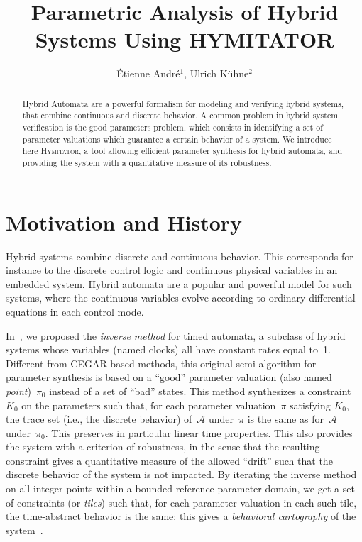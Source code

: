 \documentclass{llncs}
\title{Parametric Analysis of Hybrid Systems Using HYMITATOR}
\author{\'Etienne Andr\'e$^1$, %
	Ulrich K\"uhne$^2$%
	}
\institute{$^1$LIPN, CNRS UMR 7030, Université Paris 13, France \\
$^2$Group for Computer Architecture, University of Bremen, Germany}
\newcommand{\A}{\mathcal{A}}
\newcommand{\Ko}{K_0}
\newcommand{\pio}{\pi_0}
\newcommand{\piprime}{\pi}
\newcommand{\hymitator}{\textsc{Hymitator}}
\newcommand{\commentaire}[1]{}
\begin{document}
\maketitle

\begin{abstract}
	Hybrid Automata are a powerful formalism for modeling and verifying hybrid systems, that combine continuous and discrete behavior.
	A common problem in hybrid system verification is the good parameters problem, which consists in identifying a set of parameter valuations which guarantee a certain behavior of a system.
	We introduce here \hymitator{}, a tool allowing efficient parameter synthesis for hybrid automata, and providing the system with a quantitative measure of its robustness.
\end{abstract}


\commentaire{Version avec commentaires}


\section{Motivation and History}


Hybrid systems combine discrete and continuous behavior.
This corresponds for instance to the discrete control logic and continuous physical variables in an embedded system.
Hybrid automata are a popular and powerful model for such systems, where the continuous variables evolve according to ordinary differential equations in each control mode.

In~\cite{acef09}, we proposed the \emph{inverse method} for timed automata, a subclass of hybrid systems whose variables (named clocks) all have constant rates equal to~1.
Different from CEGAR-based methods, this original semi-algorithm for parameter synthesis is based on a ``good'' parameter valuation (also named \emph{point})~$\pio$ instead of a set of ``bad'' states.
This method synthesizes a constraint~$\Ko$ on the parameters such that, for each parameter valuation~$\piprime$ satisfying $\Ko$, the trace set (i.e., the discrete behavior) of~$\A$ under~$\piprime$ is the same as for~$\A$ under~$\pio$.
This preserves in particular linear time properties.
This also provides the system with a criterion of robustness, in the sense that the resulting constraint gives a quantitative measure of the allowed ``drift'' such that the discrete behavior of the system is not impacted.
By iterating the inverse method on all integer points within a bounded reference parameter domain, we get a set of constraints (or \emph{tiles}) such that, for each parameter valuation in each such tile, the time-abstract behavior is the same: this gives a \emph{behavioral cartography} of the system~\cite{af10}.
\end{document}
